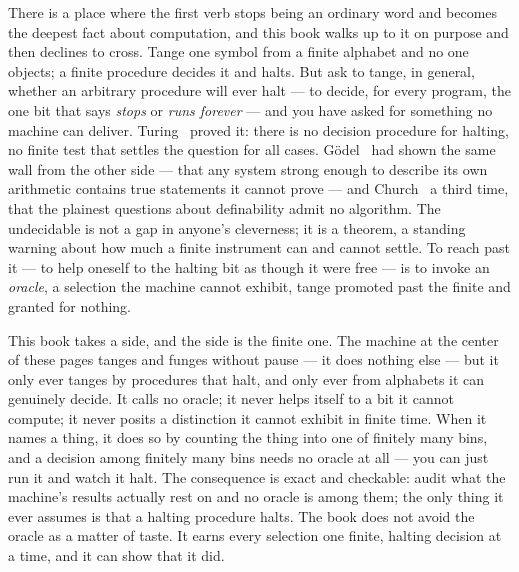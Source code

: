 There is a place where the first verb stops being an ordinary word and becomes the deepest fact about computation, and
this book walks up to it on purpose and then declines to cross. Tange one symbol from a finite alphabet and no one
objects; a finite procedure decides it and halts. But ask to tange, in general, whether an arbitrary procedure will
ever halt --- to decide, for every program, the one bit that says \emph{stops} or \emph{runs forever} --- and you have
asked for something no machine can deliver. Turing~\cite{turing1936} proved it: there is no decision procedure for
halting, no finite test that settles the question for all cases. G\"odel~\cite{godel1931} had shown the same wall from
the other side --- that any system strong enough to describe its own arithmetic contains true statements it cannot
prove --- and Church~\cite{church1936} a third time, that the plainest questions about definability admit no algorithm.
The undecidable is not a gap in anyone's cleverness; it is a theorem, a standing warning about how much a finite
instrument can and cannot settle. To reach past it --- to help oneself to the halting bit as though it were free ---
is to invoke an \emph{oracle}, a selection the machine cannot exhibit, tange promoted past the finite and granted for
nothing.

This book takes a side, and the side is the finite one. The machine at the center of these pages tanges and funges
without pause --- it does nothing else --- but it only ever tanges by procedures that halt, and only ever from
alphabets it can genuinely decide. It calls no oracle; it never helps itself to a bit it cannot compute; it never
posits a distinction it cannot exhibit in finite time. When it names a thing, it does so by counting the thing into
one of finitely many bins, and a decision among finitely many bins needs no oracle at all --- you can just run it and
watch it halt. The consequence is exact and checkable: audit what the machine's results actually rest on and no oracle
is among them; the only thing it ever assumes is that a halting procedure halts. The book does not avoid the oracle as
a matter of taste. It earns every selection one finite, halting decision at a time, and it can show that it did.

